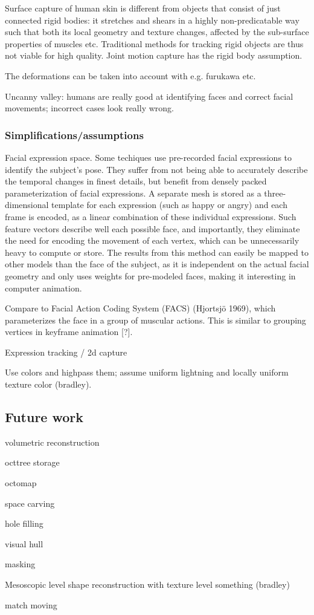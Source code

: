 Surface capture of human skin is different from objects that consist of just connected rigid bodies: it stretches and shears in a highly non-predicatable way such that both its local geometry and texture changes, affected by the sub-surface properties of muscles etc.
Traditional methods for tracking rigid objects are thus not viable for high quality.
Joint motion capture has the rigid body assumption.

The deformations can be taken into account with e.g. furukawa etc.

Uncanny valley: humans are really good at identifying faces and correct facial movements; incorrect cases look really wrong.

\subsubsection{Simplifications/assumptions}

Facial expression space. Some techiques \cite{faceshift,something} use pre-recorded facial expressions to identify the subject's pose.
They suffer from not being able to accurately describe the temporal changes in finest details, but benefit from densely packed parameterization of facial expressions.
A separate mesh is stored as a three-dimensional template for each expression (such as happy or angry) and each frame is encoded, as a linear combination of these individual expressions.
Such feature vectors describe well each possible face, and importantly, they eliminate the need for encoding the movement of each vertex, which can be unnecessarily heavy to compute or store.
The results from this method can easily be mapped to other models than the face of the subject, as it is independent on the actual facial geometry and only uses weights for pre-modeled faces, making it interesting in computer animation.

Compare to Facial Action Coding System (FACS) (Hjortsjö 1969), which parameterizes the face in a group of muscular actions. This is similar to grouping vertices in keyframe animation [?].

Expression tracking / 2d capture

Use colors and highpass them; assume uniform lightning and locally uniform texture color (bradley).

\subsection{Future work}

volumetric reconstruction

octtree storage

octomap

space carving

hole filling

visual hull

masking

Mesoscopic level shape reconstruction with texture level something (bradley)

match moving
